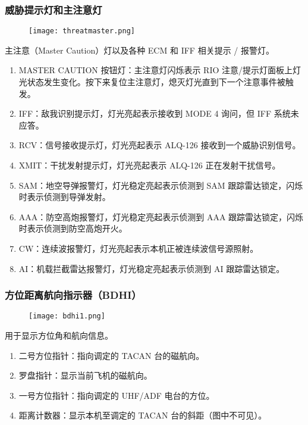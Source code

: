 \subsubsection{威胁提示灯和主注意灯}
\begin{figure}[htb]
  \center
  \texttt{[image: threatmaster.png]}
\end{figure}
主注意（Master Caution）灯以及各种 ECM 和 IFF 相关提示 / 报警灯。

\begin{enumerate}
  \item MASTER CAUTION 按钮灯：主注意灯闪烁表示 RIO 注意/提示灯面板上灯光状态发生变化。按下来复位主注意灯，熄灭灯光直到下一个注意事件被触发。
  \item IFF：敌我识别提示灯，灯光亮起表示接收到 MODE 4 询问，但 IFF 系统未应答。
  \item RCV：信号接收提示灯，灯光亮起表示 ALQ-126 接收到一个威胁识别信号。
  \item XMIT：干扰发射提示灯，灯光亮起表示 ALQ-126 正在发射干扰信号。
  \item SAM：地空导弹报警灯，灯光稳定亮起表示侦测到 SAM 跟踪雷达锁定，闪烁时表示侦测到导弹发射。
  \item AAA：防空高炮报警灯，灯光稳定亮起表示侦测到 AAA 跟踪雷达锁定，闪烁时表示侦测到防空高炮开火。
  \item CW：连续波报警灯，灯光亮起表示本机正被连续波信号源照射。
  \item AI：机载拦截雷达报警灯，灯光稳定亮起表示侦测到 AI 跟踪雷达锁定。
\end{enumerate}

\subsubsection{方位距离航向指示器（BDHI）}
\begin{figure}[htb]
  \center
  \texttt{[image: bdhi1.png]}
\end{figure}
用于显示方位角和航向信息。

\begin{enumerate}
  \item 二号方位指针：指向调定的 TACAN 台的磁航向。
  \item 罗盘指针：显示当前飞机的磁航向。
  \item 一号方位指针：指向调定的 UHF/ADF 电台的方位。
  \item 距离计数器：显示本机至调定的 TACAN 台的斜距（图中不可见）。
\end{enumerate}

